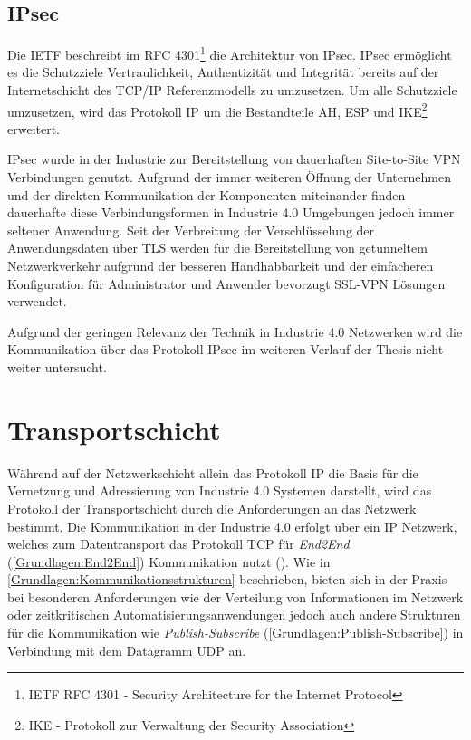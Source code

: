 \subsection{IPsec}
Die \ac{IETF} beschreibt im \ac{RFC} 4301\footnote{IETF RFC 4301 - Security Architecture for the Internet Protocol} die Architektur von \ac{IPsec}. \ac{IPsec} ermöglicht es die Schutzziele Vertraulichkeit, Authentizität und Integrität bereits auf der Internetschicht des \ac{TCP}/\ac{IP} Referenzmodells zu umzusetzen. Um alle Schutzziele umzusetzen, wird das Protokoll \ac{IP} um die Bestandteile \ac{AH}, \ac{ESP} und IKE\footnote{IKE - Protokoll zur Verwaltung der Security Association} erweitert.

\ac{IPsec} wurde in der Industrie zur Bereitstellung von dauerhaften Site-to-Site \ac{VPN} Verbindungen genutzt. Aufgrund der immer weiteren Öffnung der Unternehmen und der direkten Kommunikation der Komponenten miteinander finden dauerhafte diese Verbindungsformen in Industrie 4.0 Umgebungen jedoch immer seltener Anwendung. Seit der Verbreitung der Verschlüsselung der Anwendungsdaten über \ac{TLS} werden für die Bereitstellung von getunneltem Netzwerkverkehr aufgrund der besseren Handhabbarkeit und der einfacheren Konfiguration für Administrator und Anwender bevorzugt \ac{SSL}-\ac{VPN} Lösungen verwendet.

Aufgrund der geringen Relevanz der Technik in Industrie 4.0 Netzwerken wird die Kommunikation über das Protokoll \ac{IPsec} im weiteren Verlauf der Thesis nicht weiter untersucht.

\section{Transportschicht}
\label{Analyse:Transportschicht}
Während auf der Netzwerkschicht allein das Protokoll \ac{IP} die Basis für die Vernetzung und Adressierung von Industrie 4.0 Systemen darstellt, wird das Protokoll der Transportschicht durch die Anforderungen an das Netzwerk bestimmt. Die Kommunikation in der Industrie 4.0 erfolgt über ein \ac{IP} Netzwerk, welches zum Datentransport das Protokoll \ac{TCP} für \textit{End2End} (\autoref{Grundlagen:End2End}) Kommunikation nutzt (\cite{sichKom2017}). Wie in \autoref{Grundlagen:Kommunikationsstrukturen} beschrieben, bieten sich in der Praxis bei besonderen Anforderungen wie der Verteilung von Informationen im Netzwerk oder zeitkritischen Automatisierungsanwendungen jedoch auch andere Strukturen für die Kommunikation wie \textit{Publish-Subscribe} (\autoref{Grundlagen:Publish-Subscribe}) in Verbindung mit dem Datagramm \ac{UDP} an. 

